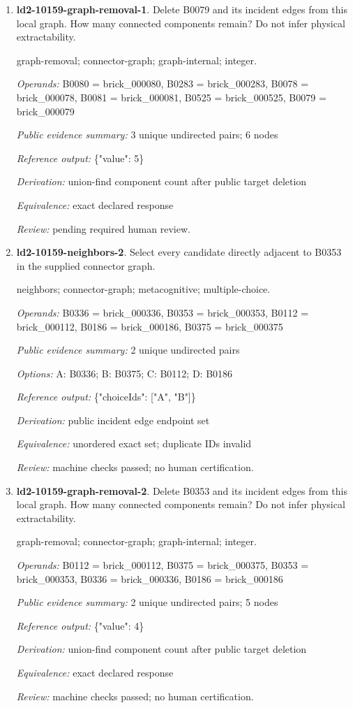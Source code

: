 \begin{enumerate}
\item \textbf{ld2-10159-graph-removal-1}. Delete B0079 and its incident edges from this local graph. How many connected components remain? Do not infer physical extractability.
\par{\small graph-removal; connector-graph; graph-internal; integer.\par\textit{Operands:} B0080 = brick\_000080, B0283 = brick\_000283, B0078 = brick\_000078, B0081 = brick\_000081, B0525 = brick\_000525, B0079 = brick\_000079\par\textit{Public evidence summary:} 3 unique undirected pairs; 6 nodes\par\textit{Reference output:} \{"value": 5\}\par\textit{Derivation:} union-find component count after public target deletion\par\textit{Equivalence:} exact declared response\par\textit{Review:} pending required human review.}
\item \textbf{ld2-10159-neighbors-2}. Select every candidate directly adjacent to B0353 in the supplied connector graph.
\par{\small neighbors; connector-graph; metacognitive; multiple-choice.\par\textit{Operands:} B0336 = brick\_000336, B0353 = brick\_000353, B0112 = brick\_000112, B0186 = brick\_000186, B0375 = brick\_000375\par\textit{Public evidence summary:} 2 unique undirected pairs\par\textit{Options:} A: B0336; B: B0375; C: B0112; D: B0186\par\textit{Reference output:} \{"choiceIds": ["A", "B"]\}\par\textit{Derivation:} public incident edge endpoint set\par\textit{Equivalence:} unordered exact set; duplicate IDs invalid\par\textit{Review:} machine checks passed; no human certification.}
\item \textbf{ld2-10159-graph-removal-2}. Delete B0353 and its incident edges from this local graph. How many connected components remain? Do not infer physical extractability.
\par{\small graph-removal; connector-graph; graph-internal; integer.\par\textit{Operands:} B0112 = brick\_000112, B0375 = brick\_000375, B0353 = brick\_000353, B0336 = brick\_000336, B0186 = brick\_000186\par\textit{Public evidence summary:} 2 unique undirected pairs; 5 nodes\par\textit{Reference output:} \{"value": 4\}\par\textit{Derivation:} union-find component count after public target deletion\par\textit{Equivalence:} exact declared response\par\textit{Review:} machine checks passed; no human certification.}

\end{enumerate}
